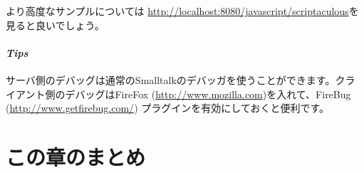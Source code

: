 \documentclass[a4paper,10pt,twoside]{book}
\begin{document}
より高度なサンプルについては \url{http://localhost:8080/javascript/scriptaculous}を見ると良いでしょう。

\paragraph{\emph{Tips}}
サーバ側のデバッグは通常のSmalltalkのデバッガを使うことができます。クライアント側のデバッグはFireFox (\url{http://www.mozilla.com})を入れて、FireBug (\url{http://www.getfirebug.com/}) プラグインを有効にしておくと便利です。

\section{この章のまとめ}

\end{document}
